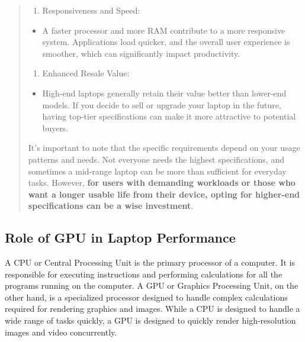 \begin{leftbar}
\begin{quote}
	\begin{enumerate}[leftmargin=*]
		\def\labelenumi{\arabic{enumi}.}
		\setcounter{enumi}{6}
		
		\item
		      Responsiveness and Speed:
	\end{enumerate}
	
	\begin{itemize}
		
		\item
		      A faster processor and more RAM contribute to a more responsive system. Applications load quicker, and the overall user experience is smoother, which can significantly impact productivity.
	\end{itemize}
	
	\begin{enumerate}[leftmargin=*]
		\def\labelenumi{\arabic{enumi}.}
		\setcounter{enumi}{7}
		
		\item
		      Enhanced Resale Value:
	\end{enumerate}
	
	\begin{itemize}
		
		\item
		      High-end laptops generally retain their value better than lower-end models. If you decide to sell or upgrade your laptop in the future, having top-tier specifications can make it more attractive to potential buyers.
	\end{itemize}
	
	It's important to note that the specific requirements depend on your usage patterns and needs. Not everyone needs the highest specifications, and sometimes a mid-range laptop can be more than sufficient for everyday tasks. However, \textbf{for users with demanding workloads or those who want a longer usable life from their device, opting for higher-end specifications can be a wise investment}.
	\end{quote}\end{leftbar}
	
	\pagebreak	\hypertarget{gpu-needs}{}\subsection{Role of GPU in Laptop Performance}\label{gpu-needs}
	A CPU or Central Processing Unit is the primary processor of a computer. It is responsible for executing instructions and performing calculations for all the programs running on the computer. A GPU or Graphics Processing Unit, on the other hand, is a specialized processor designed to handle complex calculations required for rendering graphics and images. While a CPU is designed to handle a wide range of tasks quickly, a GPU is designed to quickly render high-resolution images and video concurrently.
	
